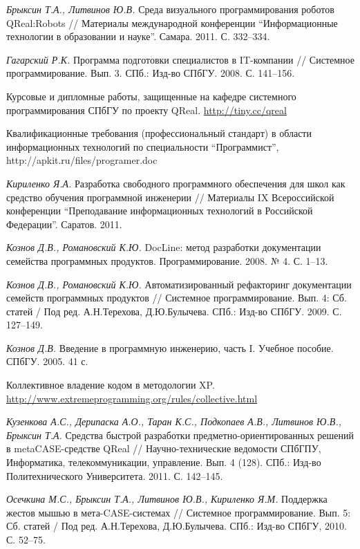 \documentclass[a4paper]{article}
\begin{document}
\begin{thebibliography}{9001}

   \emph{Брыксин Т.А., Литвинов Ю.В.} Среда визуального программирования роботов QReal:Robots // Материалы международной конференции ``Информационные технологии в образовании и науке''. Самара. 2011. С. 332--334.
  
   \emph{Гагарский Р.К.} Программа подготовки специалистов в IT-компании // Системное программирование. Вып. 3. СПб.: Изд-во СПбГУ. 2008. С. 141--156.
  
   Курсовые и дипломные работы, защищенные на кафедре системного программирования СПбГУ по проекту QReal. \url{http://tiny.cc/qreal}

   Квалификационные требования (профессиональный стандарт) в области информационных технологий по специальности ``Программист'', http://apkit.ru/files/programer.doc
  
   \emph{Кириленко Я.А.} Разработка свободного программного обеспечения для школ как средство обучения программной инженерии // Материалы IX Всероссийской конференции ``Преподавание информационных технологий в Российской Федерации''. Саратов. 2011.
  
   \emph{Кознов Д.В., Романовский К.Ю.}  DocLine: метод разработки документации семейства программных продуктов. Программирование. 2008. № 4. С. 1--13.

   \emph{Кознов Д.В., Романовский К.Ю.} Автоматизированный рефакторинг документации семейств программных продуктов // Системное программирование. Вып. 4: Сб. статей / Под ред. А.Н.Терехова, Д.Ю.Булычева. СПб.: Изд-во СПбГУ. 2009. С. 127--149.
  
   \emph{Кознов Д.В.} Введение в программную инженерию, часть I. Учебное пособие. СПбГУ. 2005. 41 с. 

   Коллективное владение кодом в методологии XP. \url{http://www.extremeprogramming.org/rules/collective.html}
  
   \emph{Кузенкова А.С., Дерипаска А.О., Таран К.С., Подкопаев А.В., Литвинов Ю.В., Брыксин Т.А.} Средства быстрой разработки предметно-ориентированных решений в metaCASE-средстве QReal // Научно-технические ведомости СПбГПУ, Информатика, телекоммуникации, управление. Вып. 4 (128). СПб.: Изд-во Политехнического Университета. 2011. С. 142--145.

  \emph{Осечкина М.С., Брыксин Т.А., Литвинов Ю.В., Кириленко Я.М.} Поддержка жестов мышью в мета-CASE-системах // Системное программирование. Вып. 5: Сб. статей / Под ред. А.Н.Терехова, Д.Ю.Булычева.  СПб.: Изд-во СПбГУ, 2010. С. 52--75.


\end{thebibliography}
\end{document}
